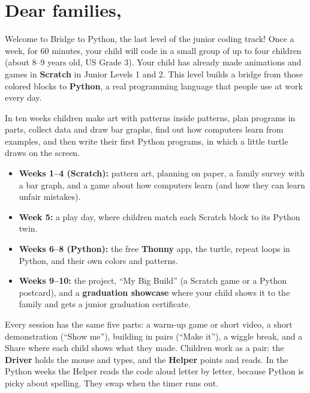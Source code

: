 \documentclass[track=junior,level=3]{kidscode}
\begin{document}

\section{Dear families,}
Welcome to Bridge to Python, the last level of the junior coding track! Once a week, for 60 minutes,
your child will code in a small group of up to four children (about 8--9 years old, US Grade 3).
Your child has already made animations and games in \textbf{Scratch} in Junior Levels 1 and 2.
This level builds a bridge from those colored blocks to \textbf{Python}, a real programming language
that people use at work every day.

In ten weeks children make art with patterns inside patterns, plan programs in parts, collect data
and draw bar graphs, find out how computers learn from examples, and then write their first Python
programs, in which a little turtle draws on the screen.
\begin{itemize}[itemsep=2pt]
  \item \textbf{Weeks 1--4 (Scratch):} pattern art, planning on paper, a family survey with a bar graph,
        and a game about how computers learn (and how they can learn unfair mistakes).
  \item \textbf{Week 5:} a play day, where children match each Scratch block to its Python twin.
  \item \textbf{Weeks 6--8 (Python):} the free \textbf{Thonny} app, the turtle, repeat loops in Python,
        and their own colors and patterns.
  \item \textbf{Weeks 9--10:} the project, \enquote{My Big Build} (a Scratch game or a Python postcard),
        and a \textbf{graduation showcase} where your child shows it to the family and gets a junior
        graduation certificate.
\end{itemize}
Every session has the same five parts: a warm-up game or short video, a short demonstration
(\enquote{Show me}), building in pairs (\enquote{Make it}), a wiggle break, and a Share where each
child shows what they made. Children work as a pair: the \textbf{Driver} holds the mouse and types,
and the \textbf{Helper} points and reads. In the Python weeks the Helper reads the code aloud letter
by letter, because Python is picky about spelling. They swap when the timer runs out.
\end{document}
